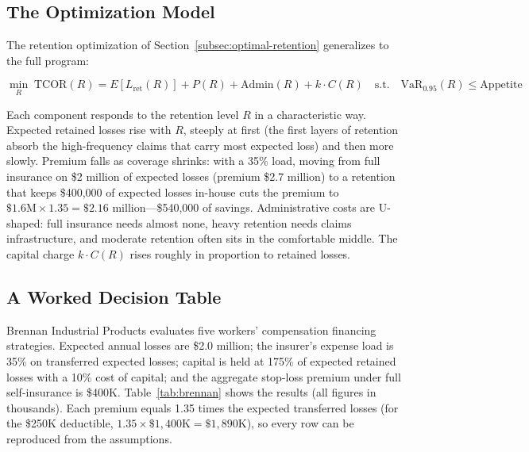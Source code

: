 \documentclass[11pt,openany]{book}
\begin{document}
\subsection{The Optimization Model}

The retention optimization of Section~\ref{subsec:optimal-retention}
generalizes to the full program:

\[
\min_{R} \; \text{TCOR}(R) = E[L_{\text{ret}}(R)] + P(R) + \text{Admin}(R)
+ k \cdot C(R)
\quad \text{s.t.} \quad \text{VaR}_{0.95}(R) \le \text{Appetite}
\]

Each component responds to the retention level \(R\) in a characteristic way.
Expected retained losses rise with \(R\), steeply at first (the first layers
of retention absorb the high-frequency claims that carry most expected loss)
and then more slowly. Premium falls as coverage shrinks: with a 35\% load,
moving from full insurance on \$2 million of expected losses (premium \$2.7
million) to a retention that keeps \$400,000 of expected losses in-house cuts
the premium to \(\$1.6\text{M} \times 1.35 = \$2.16\) million---\$540,000 of
savings. Administrative costs are U-shaped: full insurance needs almost none,
heavy retention needs claims infrastructure, and moderate retention often
sits in the comfortable middle. The capital charge \(k \cdot C(R)\) rises
roughly in proportion to retained losses.

\subsection{A Worked Decision Table}
\label{subsec:decision-table}

Brennan Industrial Products evaluates five workers' compensation financing
strategies. Expected annual losses are \$2.0 million; the insurer's expense
load is 35\% on transferred expected losses; capital is held at 175\% of
expected retained losses with a 10\% cost of capital; and the aggregate
stop-loss premium under full self-insurance is \$400K.
Table~\ref{tab:brennan} shows the results (all figures in thousands). Each
premium equals 1.35 times the expected transferred losses (for the \$250K
deductible, \(1.35 \times \$1{,}400\text{K} = \$1{,}890\text{K}\)), so every
row can be reproduced from the assumptions.
\end{document}
